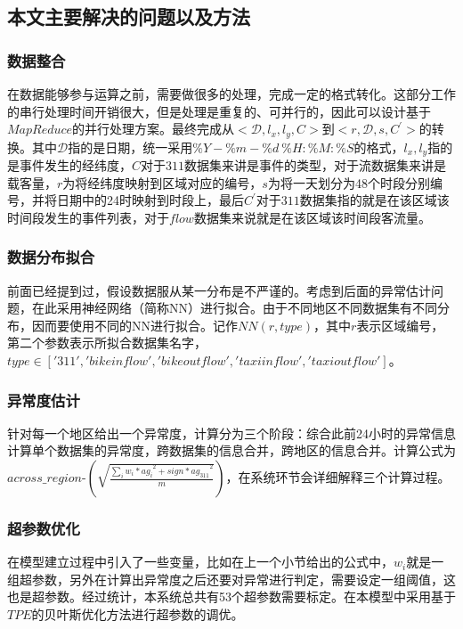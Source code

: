 \documentclass[a4paper, UTF8]{article}
\begin{document}
\begin{CJK}{UTF8}{gbsn}
\subsection{本文主要解决的问题以及方法}
\subsubsection*{数据整合}
在数据能够参与运算之前，需要做很多的处理，完成一定的格式转化。这部分工作的串行处理时间开销很大，但是处理是重复的、可并行的，因此可以设计基于$MapReduce$的并行处理方案。最终完成从$<\mathcal{D},l_x,l_y,C>$到$<r,\mathcal{D},s,C^{'}>$的转换。其中$\mathcal{D}$指的是日期，统一采用$\%Y-\%m-\%d\ \%H:\%M:\%S$的格式，$l_x,l_y$指的是事件发生的经纬度，$C$对于$311$数据集来讲是事件的类型，对于流数据集来讲是载客量，$r$为将经纬度映射到区域对应的编号，$s$为将一天划分为48个时段分别编号，并将日期中的24时映射到时段上，最后$C^{'}$对于$311$数据集指的就是在该区域该时间段发生的事件列表，对于$flow$数据集来说就是在该区域该时间段客流量。
\subsubsection*{数据分布拟合}
前面已经提到过，假设数据服从某一分布是不严谨的。考虑到后面的异常估计问题，在此采用神经网络（简称NN）进行拟合。由于不同地区不同数据集有不同分布，因而要使用不同的NN进行拟合。记作$NN(r,type)$，其中$r$表示区域编号，第二个参数表示所拟合数据集名字，$type \in ['311','bikeinflow','bikeoutflow','taxiinflow','taxioutflow']$。
	\subsubsection*{异常度估计}
针对每一个地区给出一个异常度，计算分为三个阶段：综合此前24小时的异常信息计算单个数据集的异常度，跨数据集的信息合并，跨地区的信息合并。计算公式为$across\_region$-$(\sqrt{\frac{\sum_{i}{w_i * ag_i} ^ {2} + {sign * ag_{311}} ^ {2}}{m}})$，在系统环节会详细解释三个计算过程。
	\subsubsection*{超参数优化}
在模型建立过程中引入了一些变量，比如在上一个小节给出的公式中，$w_i$就是一组超参数，另外在计算出异常度之后还要对异常进行判定，需要设定一组阈值，这也是超参数。经过统计，本系统总共有53个超参数需要标定。在本模型中采用基于$TPE$的贝叶斯优化方法进行超参数的调优。

\end{CJK}
\end{document}
